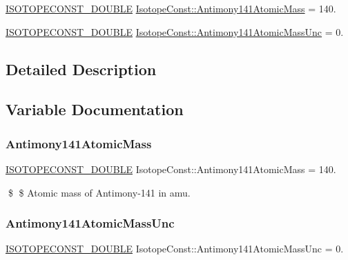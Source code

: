 \begin{DoxyCompactItemize}
\item 
\mbox{\hyperlink{group___isotope_const-_macros_ga8f45a7272ce02c0b4c65c44636ed719a}{I\+S\+O\+T\+O\+P\+E\+C\+O\+N\+S\+T\+\_\+\+D\+O\+U\+B\+LE}} \mbox{\hyperlink{group___isotope_const-_antimony-_sb141_ga9e623cc43eeedcc651b93e2ab8f81a86}{Isotope\+Const\+::\+Antimony141\+Atomic\+Mass}} = 140.
\item 
\mbox{\hyperlink{group___isotope_const-_macros_ga8f45a7272ce02c0b4c65c44636ed719a}{I\+S\+O\+T\+O\+P\+E\+C\+O\+N\+S\+T\+\_\+\+D\+O\+U\+B\+LE}} \mbox{\hyperlink{group___isotope_const-_antimony-_sb141_ga5f713b4afe153f23b231adb4d48b4f62}{Isotope\+Const\+::\+Antimony141\+Atomic\+Mass\+Unc}} = 0.
\end{DoxyCompactItemize}


\subsection{Detailed Description}


\subsection{Variable Documentation}
\mbox{\label{group___isotope_const-_antimony-_sb141_ga9e623cc43eeedcc651b93e2ab8f81a86}} 
\subsubsection{\texorpdfstring{Antimony141\+Atomic\+Mass}{Antimony141AtomicMass}}
{\footnotesize\ttfamily \mbox{\hyperlink{group___isotope_const-_macros_ga8f45a7272ce02c0b4c65c44636ed719a}{I\+S\+O\+T\+O\+P\+E\+C\+O\+N\+S\+T\+\_\+\+D\+O\+U\+B\+LE}} Isotope\+Const\+::\+Antimony141\+Atomic\+Mass = 140.}

\$ \$ Atomic mass of Antimony-\/141 in amu. \mbox{\label{group___isotope_const-_antimony-_sb141_ga5f713b4afe153f23b231adb4d48b4f62}} 
\subsubsection{\texorpdfstring{Antimony141\+Atomic\+Mass\+Unc}{Antimony141AtomicMassUnc}}
{\footnotesize\ttfamily \mbox{\hyperlink{group___isotope_const-_macros_ga8f45a7272ce02c0b4c65c44636ed719a}{I\+S\+O\+T\+O\+P\+E\+C\+O\+N\+S\+T\+\_\+\+D\+O\+U\+B\+LE}} Isotope\+Const\+::\+Antimony141\+Atomic\+Mass\+Unc = 0.}

